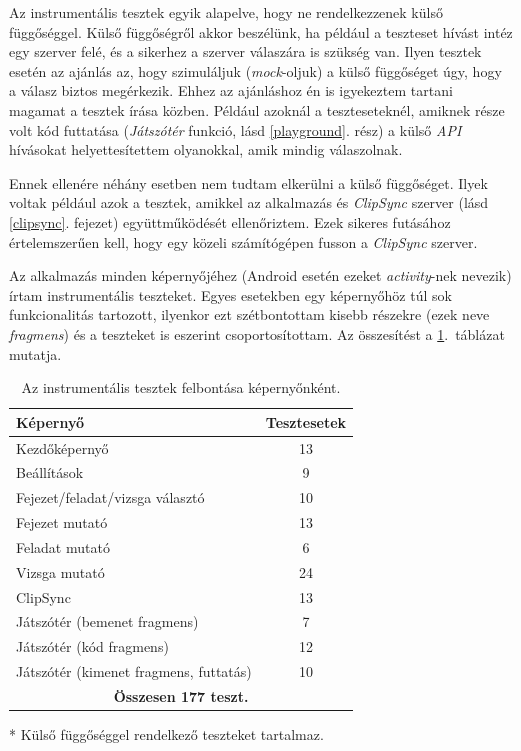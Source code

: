 \documentclass[12pt,a4paper]{article}
\begin{document}
	 Az instrumentális tesztek egyik alapelve, hogy ne rendelkezzenek külső függőséggel. Külső függőségről akkor beszélünk, ha például a teszteset hívást intéz egy szerver felé, és a sikerhez a szerver válaszára is szükség van. Ilyen tesztek esetén az ajánlás az, hogy szimuláljuk (\textit{mock}-oljuk) a külső függőséget úgy, hogy a válasz biztos megérkezik. Ehhez az ajánláshoz én is igyekeztem tartani magamat a tesztek írása közben. Például azoknál a teszteseteknél, amiknek része volt kód futtatása (\textit{Játszótér} funkció, lásd \ref{playground}. rész) a külső \textit{API} hívásokat helyettesítettem olyanokkal, amik mindig válaszolnak. 
	 
	 Ennek ellenére néhány esetben nem tudtam elkerülni a külső függőséget. Ilyek voltak például azok a tesztek, amikkel az alkalmazás és \textit{ClipSync} szerver (lásd \ref{clipsync}. fejezet) együttműködését ellenőriztem. Ezek sikeres futásához értelemszerűen kell, hogy egy közeli számítógépen fusson a \textit{ClipSync} szerver.
	
	 Az alkalmazás minden képernyőjéhez (Android esetén ezeket \textit{activity}-nek nevezik) írtam instrumentális teszteket. Egyes esetekben egy képernyőhöz túl sok funkcionalitás tartozott, ilyenkor ezt szétbontottam kisebb részekre (ezek neve \textit{fragmens}) és a teszteket is eszerint csoportosítottam. Az összesítést a \ref{table_test_summary}.\ táblázat mutatja. 
	
	\bigskip
	\begin{table}[h!]
		\centering
			\begin{threeparttable}
			\begin{tabular}{|l|c|}
				\hline
				\textbf{Képernyő} & \textbf{Tesztesetek} \\
				\hline
				Kezdőképernyő & 13 \\
				\hline
				Beállítások & 9 \\
				\hline
				Fejezet/feladat/vizsga választó & 10 \\
				\hline
				Fejezet mutató & 13 \\
				\hline
				Feladat mutató & 6 \\
				\hline
				Vizsga mutató & 24 \\
				\hline
				ClipSync & 13\tnote{*} \\
				\hline
				Játszótér (bemenet fragmens) & 7 \\
				\hline
				Játszótér (kód fragmens) & 12 \\
				\hline
				Játszótér (kimenet fragmens, futtatás) & 10 \\
				\hline
				\multicolumn{2}{|c|}{\textbf{Összesen 177 teszt.}}\\
				\hline
			\end{tabular}
			\begin{tablenotes}
				\item[*] Külső függőséggel rendelkező teszteket tartalmaz.
			\end{tablenotes}
		\end{threeparttable}
		\caption{Az instrumentális tesztek felbontása képernyőnként.}
		\label{table_test_summary}
	\end{table}
\end{document}
